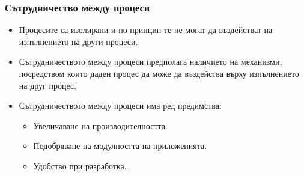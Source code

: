 \documentclass[ignorenonframetext, hyperref=unicode]{beamer}
\begin{document}
\begin{frame}\frametitle{Сътрудничество между процеси}
\begin{itemize}
\item Процесите са изолирани и по принцип те не могат да въздействат на
изпълнението на други процеси.
\item Сътрудничеството между процеси предполага наличието на механизми,
посредством които даден процес да може да въздейства върху изпълнението на друг
процес.
\item Сътрудничеството между процеси има ред предимства:
\begin{itemize}
  \item Увеличаване на производителността.
  \item Подобряване на модулността на приложенията.
  \item Удобство при разработка.
\end{itemize}
\end{itemize}
\end{frame}
       
\end{document}
